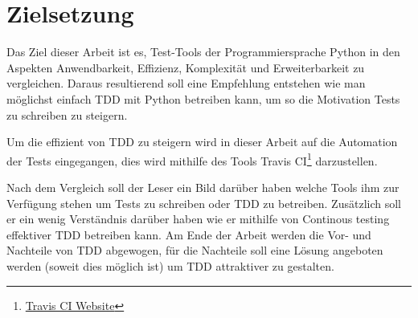 \section{Zielsetzung}
Das Ziel dieser Arbeit ist es, Test-Tools der Programmiersprache Python in den
Aspekten Anwendbarkeit, Effizienz, Komplexität und Erweiterbarkeit zu
vergleichen. Daraus resultierend soll eine Empfehlung entstehen wie man
möglichst einfach TDD mit Python betreiben kann, um so die Motivation Tests zu
schreiben zu steigern.

Um die effizient von TDD zu steigern wird in dieser Arbeit auf die Automation
der Tests eingegangen, dies wird mithilfe des Tools
Travis CI\footnote{\href{https://travis-ci.org/}{Travis CI Website}}
darzustellen.

Nach dem Vergleich soll der Leser ein Bild darüber haben welche Tools ihm zur
Verfügung stehen um Tests zu schreiben oder TDD zu betreiben. Zusätzlich soll
er ein wenig Verständnis darüber haben wie er mithilfe von
\gls{Continous testing} effektiver TDD betreiben kann.
\newline
Am Ende der Arbeit werden die Vor- und Nachteile von TDD abgewogen, für die
Nachteile soll eine Lösung angeboten werden (soweit dies möglich ist) um TDD
attraktiver zu gestalten.
